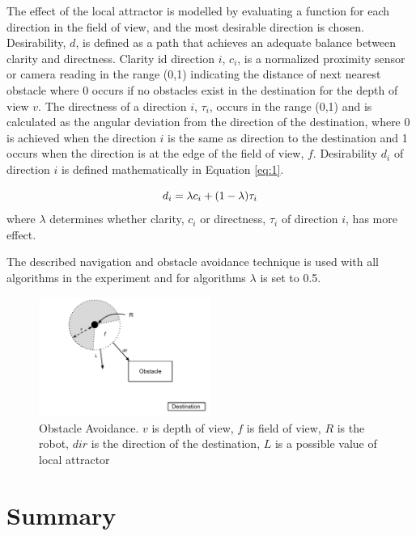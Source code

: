 The effect of the local attractor is modelled by evaluating a function for each direction in the field of view, and the most desirable direction is chosen. Desirability, $d$, is defined as a path that achieves an adequate balance between clarity and directness. Clarity id direction $i$, $c_i$, is a normalized proximity sensor or camera reading in the range (0,1) indicating the distance of next nearest obstacle where 0 occurs if no obstacles exist in the destination for the depth of view $v$. The directness of a direction $i$, $\tau_i$, occurs in the range (0,1) and is calculated as the angular deviation from the direction of the destination, where 0 is achieved when the direction $i$ is the same as direction to the destination and 1 occurs when the direction is at the edge of the field of view, $f$. Desirability $d_i$ of direction $i$ is defined mathematically in Equation \ref{eq:1}.

\begin{equation}
	d_i= \lambda c_i + (1 - \lambda)\tau_i \\
	\label{eq:1}
\end{equation} where $\lambda$ determines whether clarity, $c_i$ or directness, $\tau_i$ of direction $i$, has more effect.
 
The described navigation and obstacle avoidance technique is used with all algorithms in the experiment and for algorithms $\lambda$ is set to 0.5.

\begin{figure}
	\centering
	\includegraphics[width=0.5\textwidth]{chapters/chapter3/figures/ObstacleAvoidance.pdf}
	\caption{Obstacle Avoidance. $v$ is depth of view, $f$ is field of view, $R$ is the robot, $dir$ is the direction of the destination, $L$ is a possible value of local attractor}
	\label{fig:obstacleavoidance}
\end{figure}


\section{Summary}
\label{sec:second:summary}

